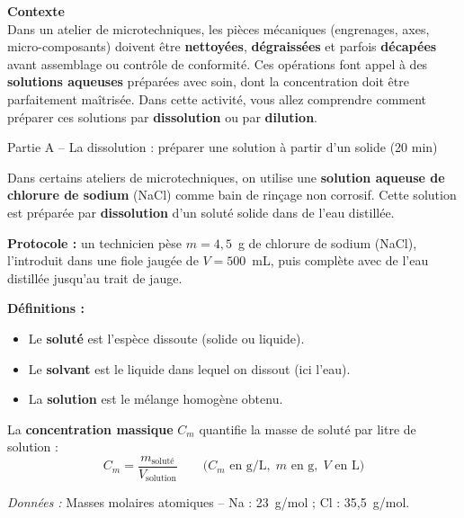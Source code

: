 \documentclass[12pt,a4paper]{article}
\begin{document}
\begin{tcolorbox}[styleinfo]
  \textbf{\color{bluedark}Contexte}\\[4pt]
  Dans un atelier de microtechniques, les pièces mécaniques (engrenages, axes, micro-composants)
  doivent être \textbf{nettoyées}, \textbf{dégraissées} et parfois \textbf{décapées} avant
  assemblage ou contrôle de conformité. Ces opérations font appel à des \textbf{solutions
  aqueuses} préparées avec soin, dont la concentration doit être parfaitement maîtrisée.
  Dans cette activité, vous allez comprendre comment préparer ces solutions par
  \textbf{dissolution} ou par \textbf{dilution}.
\end{tcolorbox}

\vspace{4pt}

\begin{tcolorbox}[stylepartie]
  Partie A -- La dissolution : préparer une solution à partir d'un solide \hfill {\normalfont\small (20 min)}
\end{tcolorbox}

\begin{tcolorbox}[styledoc, title={Document 1 -- Préparation d'une solution saline en atelier}]
  Dans certains ateliers de microtechniques, on utilise une \textbf{solution aqueuse de
  chlorure de sodium} (NaCl) comme bain de rinçage non corrosif. Cette solution est préparée
  par \textbf{dissolution} d'un soluté solide dans de l'eau distillée.

  \medskip

  \textbf{Protocole :} un technicien pèse $m = 4{,}5$~g de chlorure de sodium (NaCl),
  l'introduit dans une fiole jaugée de $V = 500$~mL, puis complète avec de l'eau distillée
  jusqu'au trait de jauge.

  \medskip

  \textbf{Définitions :}
  \begin{itemize}[noitemsep, leftmargin=1.5em]
    \item Le \textbf{soluté} est l'espèce dissoute (solide ou liquide).
    \item Le \textbf{solvant} est le liquide dans lequel on dissout (ici l'eau).
    \item La \textbf{solution} est le mélange homogène obtenu.
  \end{itemize}

  \medskip

  La \textbf{concentration massique} $C_m$ quantifie la masse de soluté par litre de
  solution :
  \[
    C_m = \dfrac{m_{\text{soluté}}}{V_{\text{solution}}}
    \qquad
    \bigl(C_m \text{ en g/L},\; m \text{ en g},\; V \text{ en L}\bigr)
  \]

  \medskip
  \textit{Données :} Masses molaires atomiques -- Na : 23~g/mol ; Cl : 35,5~g/mol.
\end{tcolorbox}
\end{document}
